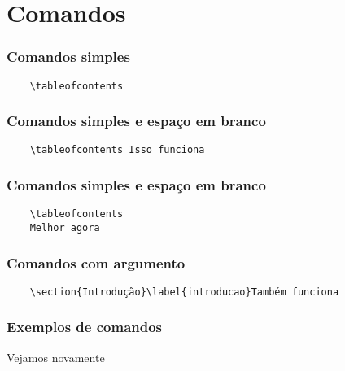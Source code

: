\section{Comandos}

\begin{frame}[fragile]
  \frametitle{Comandos simples}
  \begin{verbatim}
    \tableofcontents
  \end{verbatim}
\end{frame}

\begin{frame}[fragile]
  \frametitle{Comandos simples e espaço em branco}
  \begin{verbatim}
    \tableofcontents Isso funciona
  \end{verbatim}
\end{frame}

\begin{frame}[fragile]
  \frametitle{Comandos simples e espaço em branco}
  \begin{verbatim}
    \tableofcontents
    Melhor agora
  \end{verbatim}
\end{frame}

\begin{frame}[fragile]
  \frametitle{Comandos com argumento}
  \begin{verbatim}
    \section{Introdução}\label{introducao}Também funciona
  \end{verbatim}
\end{frame}

\begin{frame}
  \frametitle{Exemplos de comandos}
  \huge
  Vejamos  novamente
\end{frame}

